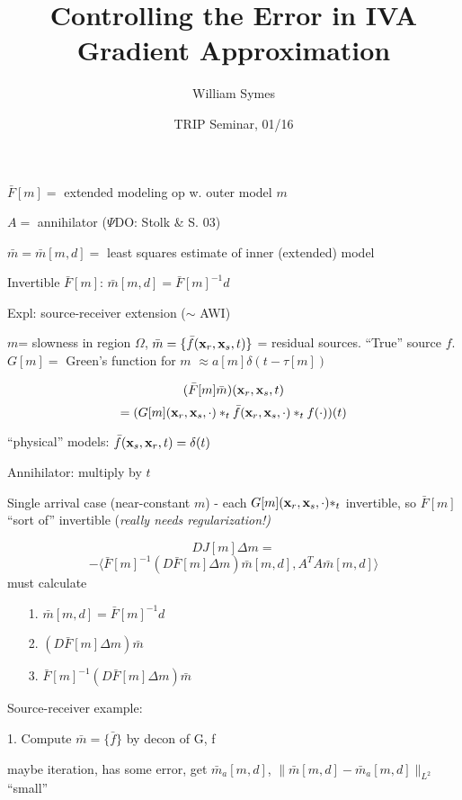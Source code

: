 \documentclass[xcolor=dvipsnames,20pt,aspectratio=169]{beamer}
\title[]{Controlling the Error in IVA Gradient Approximation}
\author[]{William Symes}
\date{TRIP Seminar, 01/16}
\newcommand{\oF}{\bar{F}}
\newcommand{\om}{\bar{m}}
\begin{document}
\frame{
\small{\titlepage}
}

\begin{frame}
$\oF[m] = $ extended modeling op w. outer model $m$

$A = $ annihilator ($\Psi$DO: Stolk \& S. 03)

$\om = \om[m,d] =$ least squares estimate of inner (extended) model

{\color{blue} Invertible $\oF[m]$}: $\om[m,d]=\oF[m]^{-1}d$
\end{frame}

\begin{frame}
Expl: source-receiver extension ($\sim$ AWI)

$m$= slowness in region $\Omega$, $\om = \{\bar{f}(\bx_r,\bx_s,t)\}$ = residual sources. ``True'' source $f$. $G[m] = $ Green's function for $m$ $\approx a[m]\delta(t-\tau[m])$
 
\[
(\oF[m]\om)(\bx_r,\bx_s,t) 
\]
\[
= (G[m](\mathbf{x}_r,\mathbf{x}_s,\cdot) *_t \bar{f}(\mathbf{x}_r,\mathbf{x}_s,\cdot) *_t f(\cdot))(t)
\]
\end{frame}

\begin{frame}
``physical'' models: $\bar{f}(\mathbf{x}_s,\mathbf{x}_r,t) = \delta(t)$

Annihilator: multiply by $t$

Single arrival case (near-constant $m$) - each $G[m](\mathbf{x}_r,\mathbf{x}_s,\cdot)*_t$ invertible, so $\oF[m]$ ``sort of'' invertible {(\em really needs regularization!)}
\end{frame}

\begin{frame}
\[
DJ[m]\Delta m = 
\]
\[
-\langle \oF[m]^{-1}(D\oF[m]\Delta m)\om[m,d],A^TA\om[m,d]\rangle 
\]
must calculate
\begin{itemize}
\item[1. ] $\om[m,d]=\oF[m]^{-1}d$
\item[2. ] $(D\oF[m]\Delta m)\om$
\item[3. ] $\oF[m]^{-1} (D\oF[m]\Delta m)\om$
\end{itemize}
\end{frame}

\begin{frame}
Source-receiver example:

1. Compute $\om = \{\bar{f}\}$ by decon of G, f 

maybe iteration, has some error, get $\om_a[m,d]$, 
$\|\om[m,d]-\om_a[m,d]\|_{L^2}$ ``small''

\end{frame}
\end{document}
